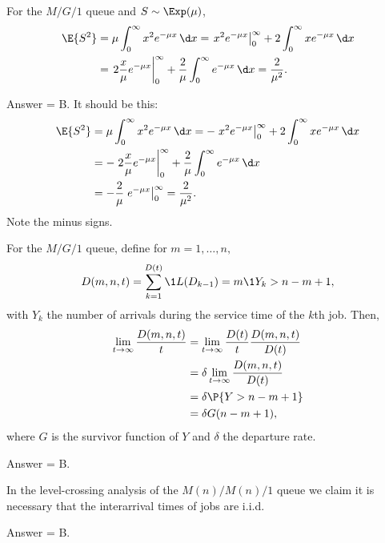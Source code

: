 \begin{exercise}[201804]
For the $M/G/1$ queue and $S\sim \Exp(\mu)$,
 \begin{align*}
\E{S^2} 
&= \mu \int_0^\infty x^2 e^{- \mu x} \,\d x = \left. x^2 e^{-\mu x} \right|_0^\infty + 2 \int_0^\infty x e^{-\mu x} \, \d x \\
&= \left. 2\frac x \mu e^{-\mu x} \right|_0^\infty + \frac 2 \mu\int_0^\infty e^{-\mu x} \, \d x =\frac2{\mu^2}.
 \end{align*}
\begin{solution}
Answer = B.
It should be this:
 \begin{align*}
\E{S^2} 
&= \mu \int_0^\infty x^2 e^{- \mu x} \,\d x = -\left. x^2 e^{-\mu x} \right|_0^\infty + 2 \int_0^\infty x e^{-\mu x} \, \d x \\
&= -\left. 2\frac x \mu e^{-\mu x} \right|_0^\infty + \frac 2 \mu\int_0^\infty e^{-\mu x} \, \d x \\
&= - \frac 2 \mu \left. e^{-\mu x}\right|_0^\infty = \frac2{\mu^2}.
 \end{align*}
Note the minus signs.
\end{solution}
\end{exercise}

\begin{exercise}[201804]
For the $M/G/1$ queue, define for $m=1,\ldots, n,$
\begin{equation*}
 D(m, n, t) = \sum_{k=1}^{D(t)}\1{L(D_{k-1})=m}\1{Y_k>n-m+1},
\end{equation*}
with $Y_k$ the number of arrivals during the service time of the $k$th job. 
Then,
\begin{align*}
 \lim_{t\to\infty} \frac{ D(m, n, t)}t 
&= \lim_{t\to\infty} \frac{D(t)}t\frac{ D(m, n, t)}{D(t)} \\
&= \delta \lim_{t\to\infty} \frac{ D(m, n, t)}{D(t)} \\
&= \delta \P{Y>n-m+1}\\
& = \delta G(n-m+1),
\end{align*}
where $G$ is the survivor function of $Y$ and $\delta$ the departure rate.
\begin{solution}
Answer = B.
\end{solution}
\end{exercise}



\begin{exercise}[201807]
In the level-crossing analysis of the $M(n)/M(n)/1$ queue we claim it is necessary that the interarrival times of jobs are i.i.d.
\begin{solution}
Answer = B. 
\end{solution}
\end{exercise}

